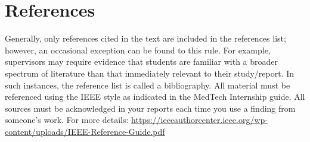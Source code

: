 %





\section*{References}

\printbibliography


Generally, only references cited in the text are included in the references list; however, an occasional exception can be found to this rule. For example, supervisors may require evidence that students are familiar with a broader spectrum of literature than that immediately relevant to their study/report. In such instances, the reference list is called a bibliography. All material must be referenced using the IEEE style as indicated in the MedTech Internship guide. All sources must be acknowledged in your reports each time you use a finding from
someone's work. For more details: \href{https://ieeeauthorcenter.ieee.org/wp-content/uploads/IEEE-Reference-Guide.pdf}{https://ieeeauthorcenter.ieee.org/wp-content/uploads/IEEE-Reference-Guide.pdf}